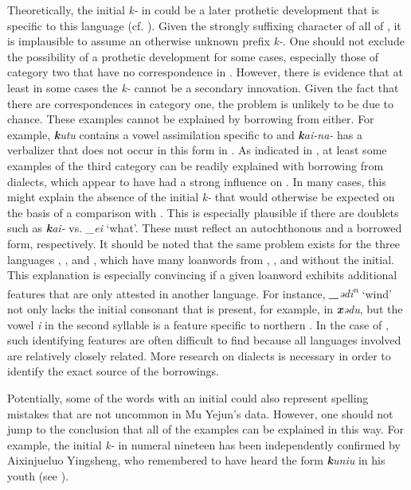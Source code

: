 \documentclass[output=paper,hidelinks]{langscibook}
\begin{document}
Theoretically, the initial \textit{k-} in  could be a later prothetic development that is specific to this language (cf. \citealt{Shirokogoroff1931}). Given the strongly suffixing character of all of , it is implausible to assume an otherwise unknown prefix \textit{k-}. One should not exclude the possibility of a prothetic development for some cases, especially those of category two that have no correspondence in . However, there is evidence that at least in some cases the \textit{k-} cannot be a secondary innovation. Given the fact that there are  correspondences in category one, the problem is unlikely to be due to chance. These examples cannot be explained by borrowing from  either. For example,  \textit{\textbf{k}utu} contains a vowel assimilation specific to  and \textit{\textbf{k}ai-na-} has a verbalizer that does not occur in this form in . As indicated in , at least some examples of the third category can be readily explained with borrowing from  dialects, which appear to have had a strong influence on . In many cases, this might explain the absence of the initial \textit{k-} that would otherwise be expected on the basis of a comparison with . This is especially plausible if there are doublets such as \textit{\textbf{k}ai-} vs. \textit{\_ei} `what'. These must reflect an autochthonous and a borrowed form, respectively. It should be noted that the same problem exists for the three  languages , , and , which have many loanwords from , , and  without the initial. This explanation is especially convincing if a given loanword exhibits additional features that are only attested in another language. For instance,  \textit{\textbf{\_}ǝdi\textsuperscript{n}} `wind' not only lacks the initial consonant that is present, for example, in  \textit{\textbf{x}ǝdu}, but the vowel \textit{i} in the second syllable is a feature specific to northern  \citep{Benzing1956}. In the case of , such identifying features are often difficult to find because all languages involved are relatively closely related. More research on  dialects is necessary in order to identify the exact source of the borrowings.

Potentially, some of the words with an initial could also represent spelling mistakes that are not uncommon in Mu Yejun's data. However, one should not jump to the conclusion that all of the examples can be explained in this way. For example, the initial \textit{k-} in numeral nineteen has been independently confirmed by Aixinjueluo Yingsheng, who remembered to have heard the form \textit{\textbf{k}uniu} in his youth (see \citealt{Aixinjueluo2014,Hölzl2017}).
\end{document}
